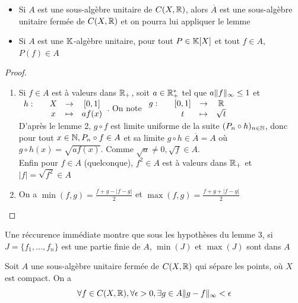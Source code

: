 \documentclass[]{report}
\begin{document}
    \begin{re}{}{}
        \begin{itemize}
            \item Si $A$ est une sous-algèbre unitaire de $C(X,\mathbb{R})$, alors $\overline{A}$ est une sous-algèbre unitaire fermée de $C(X,\mathbb{R})$ et on pourra lui appliquer le lemme
            \item Si $A$ est une $\mathbb{K}$-algèbre unitaire, pour tout $P\in \mathbb{K}[X]$ et tout $f\in A$, $P(f)\in A$
        \end{itemize}
    \end{re}

    \begin{proof}
        \begin{enumerate}
            \item Si $f\in A$ est à valeurs dans $\mathbb{R}_+$, soit $a\in \mathbb{R}_+^*$ tel que $a\lVert f \rVert_\infty\le 1$ et $\begin{array}{ccccc} h : & & X & \to & [0,1] \\ & & x & \mapsto & af(x) \end{array}$. On note $\begin{array}{ccccc} g : & & [0,1] & \to & \mathbb{R} \\ & & t & \mapsto & \sqrt{t} \end{array}$\\
            D'après le lemme 2, $g\circ f$ est limite uniforme de la suite $(P_n\circ h)_{n\in\mathbb{N}}$, donc pour tout $x\in \mathbb{N}, P_n\circ f\in A$ et sa limite $g\circ h\in \overline{A}=A$ où $g\circ h(x)=\sqrt{af(x)}$. Comme $\sqrt{a}\neq 0,\sqrt f\in A$.\\
            Enfin pour $f\in A$ (quelconque), $f^{2}\in A$ est à valeurs dans $\mathbb{R}_+$ et $|f|=\sqrt{f^2}\in A$
            \item On a $\min(f,g)=\frac{f+g-|f-g|}{2}$ et $\max(f,g)=\frac{f+g+|f-g|}{2}$ 
        \end{enumerate}
    \end{proof}

    \begin{re}{}{}
        Une réccurence immédiate montre que sous les hypothèses du lemme 3, si $J=\{f_1,\ldots,f_n\}$ est une partie finie de $A$, $\min(J)$ et $\max(J)$ sont dans $A$
    \end{re}

    \begin{lm}{}{}
        Soit $A$ une sous-algèbre unitaire fermée de $C(X,\mathbb{R})$ qui sépare les points, où $X$ est compact. On a
        \[\forall f\in C(X,\mathbb{R}),\forall \epsilon>0,\exists g\in A \lVert g-f \rVert_\infty <\epsilon\]
    \end{lm}
\end{document}
